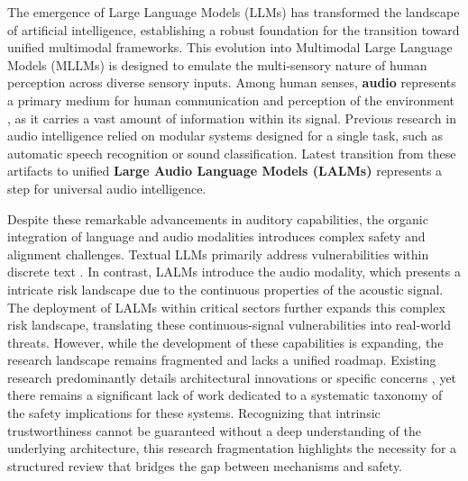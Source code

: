 \documentclass{llmxive}
\begin{document}
The emergence of Large Language Models (LLMs) \cite {ouyang2022training, achiam2023gpt,touvron2023llama, bai2023qwen, liu2024deepseek, guo2025deepseek} has transformed the landscape of artificial intelligence, establishing a robust foundation for the transition toward unified multimodal frameworks. This evolution into Multimodal Large Language Models (MLLMs) \cite{yan2025position, yan2025survey, team2026qwen3} is designed to emulate the multi-sensory nature of human perception across diverse sensory inputs. Among human senses, \textbf{audio} represents a primary medium for human communication and perception of the environment \cite{latif2023sparks}, as it carries a vast amount of information within its signal. Previous research in audio intelligence relied on modular systems designed for a single task, such as automatic speech recognition\cite{wang2026audio, shi2026qwen3} or sound classification\cite{gemmeke2017audio, kong2020panns}. Latest transition from these artifacts to unified \textbf{Large Audio Language Models (LALMs)} \cite{chu2023qwen, tang2023salmonn, rubenstein2023audiopalm, chu2024qwen2, wu2025step} represents a step for universal audio intelligence.

Despite these remarkable advancements in auditory capabilities, the organic integration of language and audio modalities introduces complex safety and alignment challenges. Textual LLMs primarily address vulnerabilities within discrete text \cite{shi2024large, wang2025comprehensive, yu2025survey, ma2026safety}. In contrast, LALMs introduce the audio modality, which presents a intricate risk landscape \cite{lin2025hidden, chen2025synthetic, aloufi2026evaluation, chen2026hijacking} due to the continuous properties of the acoustic signal. The deployment of LALMs within critical sectors further expands this complex risk landscape, translating these continuous-signal vulnerabilities into real-world threats. However, while the development of these capabilities is expanding, the research landscape remains fragmented and lacks a unified roadmap. Existing research predominantly details architectural innovations \cite{sakshi2025spur, alex2025pal, you2026world} or specific concerns \cite{luong2025llamapartialspoof, li2025dfallm, nguyen2026analyzing}, yet there remains a significant lack of work dedicated to a systematic taxonomy of the safety implications for these systems. Recognizing that intrinsic trustworthiness cannot be guaranteed without a deep understanding of the underlying architecture, this research fragmentation highlights the necessity for a structured review that bridges the gap between mechanisms and safety.
\end{document}
